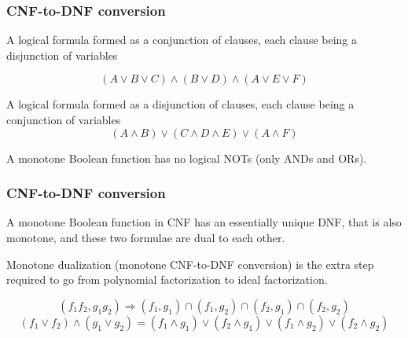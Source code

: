 \documentclass[11pt]{beamer}
\begin{document}
\begin{frame}
\frametitle{CNF-to-DNF conversion}

\begin{definition}
A logical formula formed as a conjunction of clauses, each clause being a disjunction of variables

\[
(A \vee B \vee C) \wedge (B \vee D) \wedge (A \vee E \vee F)
\]
\end{definition}

\begin{definition}
A logical formula formed as a disjunction of clauses, each clause being a conjunction of variables
\[
(A \wedge B) \vee (C \wedge D \wedge E) \vee (A \wedge F)
\]
\end{definition}

\begin{definition}
A monotone Boolean function has no logical NOTs (only ANDs and ORs).
\end{definition}
\end{frame}

\begin{frame}
\frametitle{CNF-to-DNF conversion}

\begin{definition}
A monotone Boolean function in CNF has an essentially unique DNF, that is also monotone,
and these two formulae are dual to each other.
\end{definition}

\vskip 12pt

Monotone dualization (monotone CNF-to-DNF conversion) is the extra step required to go from polynomial factorization to ideal factorization.

\[
(f_1 f_2, g_1 g_2) \Rightarrow (f_1, g_1) \cap (f_1, g_2) \cap (f_2, g_1) \cap (f_2, g_2)
\]
\[
(f_1 \vee f_2) \wedge (g_1 \vee g_2) = (f_1 \wedge g_1) \vee (f_2 \wedge g_1) \vee (f_1 \wedge g_2) \vee (f_2 \wedge g_2)
\]
\end{frame}
\end{document}
